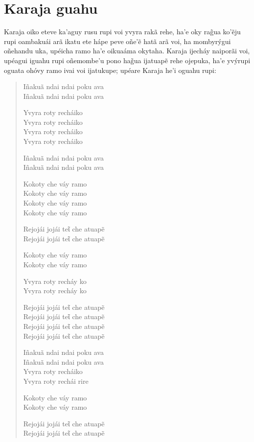 \chapter{Karaja guahu}

Karaja oiko eteve ka'aguy rusu rupi voi yvyra rakã rehe, ha'e oky rag̃ua
ko'ẽju rupi oambakuái arã ikatu ete hápe peve oñe'ẽ hatã arã voi, ha
mombyrýgui oñehandu uka, upéicha ramo ha'e oikuaáma okytaha. Karaja
ijecháy naiporãi voi, upéagui iguahu rupi oñemombe'u pono hag̃ua ijatuapẽ
rehe ojepuka, ha'e yvýrupi oguata ohóvy ramo ivai voi ijatukupe; upéare
Karaja he'i oguahu rupi:

\begin{verse}
Iñakuã ndai ndai poku ava\footnotemark{}\\
Iñakuã ndai ndai poku ava

Yvyra roty recháiko\\
Yvyra roty recháiko\\
Yvyra roty recháiko\\
Yvyra roty recháiko

Iñakuã ndai ndai poku ava\\
Iñakuã ndai ndai poku ava

Kokoty che váy ramo\\
Kokoty che váy ramo\\
Kokoty che váy ramo\\
Kokoty che váy ramo

Rejojái jojái teῖ che atuapẽ\\
Rejojái jojái teῖ che atuapẽ

Kokoty che váy ramo\\
Kokoty che váy ramo

Yvyra roty recháy ko\\
Yvyra roty recháy ko

Rejojái jojái teῖ che atuapẽ\\
Rejojái jojái teῖ che atuapẽ\\
Rejojái jojái teῖ che atuapẽ\\
Rejojái jojái teῖ che atuapẽ

Iñakuã ndai ndai poku ava\\
Iñakuã ndai ndai poku ava\\
Yvyra roty recháiko\\
Yvyra roty rechái rire

Kokoty che váy ramo\\
Kokoty che váy ramo

Rejojái jojái teῖ che atuapẽ\\
Rejojái jojái teῖ che atuapẽ
\end{verse}

